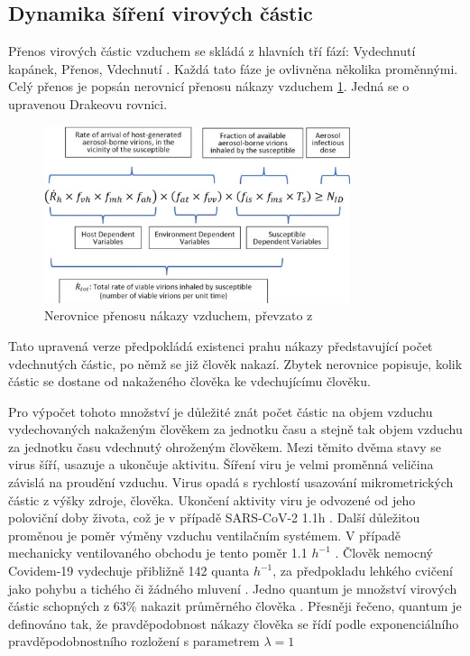 \documentclass[11pt,a4paper]{article}
\begin{document}
\subsection{Dynamika šíření virových částic}
Přenos virových částic vzduchem se skládá z hlavních tří fází: Vydechnutí kapánek, Přenos, Vdechnutí \cite{math-model}. Každá tato fáze je ovlivněna několika
proměnnými. Celý přenos je popsán nerovnicí přenosu nákazy vzduchem \ref{fig:CAT}. Jedná se o upravenou Drakeovu rovnici.
\begin{figure}[h!]
    \caption{Nerovnice přenosu nákazy vzduchem, převzato z \cite{math-model}}
    \label{fig:CAT}
    \begin{center}
      \includegraphics[width=0.8\textwidth]{spread_equation.png}
      \end{center}
\end{figure}    
Tato upravená verze předpokládá existenci prahu nákazy představující počet vdechnutých částic,
po němž se již člověk nakazí. Zbytek nerovnice popisuje, kolik částic se dostane od nakaženého člověka ke vdechujícímu člověku.

Pro výpočet tohoto množství je důležité znát počet částic na objem vzduchu vydechovaných nakaženým člověkem za jednotku času a stejně tak objem vzduchu
za jednotku času vdechnutý ohroženým člověkem. Mezi těmito dvěma stavy se virus šíří, usazuje a ukončuje aktivitu.
Šíření viru je velmi proměnná veličina závislá na proudění vzduchu. Virus opadá s rychlostí usazování mikrometrických částic z výšky
zdroje, člověka. Ukončení aktivity viru je odvozené od jeho poloviční doby života, což je v případě SARS-CoV-2 1.1h \cite{emission}.
Další důležitou proměnou je poměr výměny vzduchu ventilačním systémem. V případě mechanicky ventilovaného obchodu je tento poměr 1.1 $h^{-1}$ \cite{emission}.
Člověk nemocný Covidem-19 vydechuje přibližně 142 quanta $h^{-1}$, za předpokladu lehkého cvičení jako pohybu a tichého či žádného mluvení \cite{emission}.
Jedno quantum je množství virových částic schopných z 63\% nakazit průměrného člověka \cite{emission}.
Přesněji řečeno, quantum je definováno tak, že pravděpodobnost nákazy člověka se řídí podle exponenciálního pravděpodobnostního rozložení s parametrem $\lambda = 1$ \cite{spread-sim}
\end{document}
